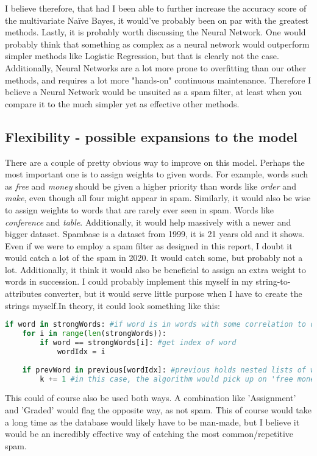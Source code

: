 \documentclass{article}
\begin{document}
I believe therefore, that had I been able to further increase the accuracy score of the multivariate Naïve Bayes, it would've probably been on par with the greatest methods. \newline
Lastly, it is probably worth discussing the Neural Network. One would probably think that something as complex as a neural network would outperform simpler methods like Logistic Regression, but that is clearly not the case. Additionally, Neural Networks are a lot more prone to overfitting than our other methods, and requires a lot more "hands-on" continuous maintenance. Therefore I believe a Neural Network would be unsuited as a spam filter, at least when you compare it to the much simpler yet as effective other methods.
\newpage
\subsection*{Flexibility - possible expansions to the model}
There are a couple of pretty obvious way to improve on this model. Perhaps the most important one is to assign weights to given words. For example, words such as \textit{free} and \textit{money} should be given a higher priority than words like \textit{order} and \textit{make}, even though all four might appear in spam. Similarly, it would also be wise to assign weights to words that are rarely ever seen in spam. Words like \textit{conference} and \textit{table}. \newline
Additionally, it would help massively with a newer and bigger dataset. Spambase is a dataset from 1999, it is 21 years old and it shows. Even if we were to employ a spam filter as designed in this report, I doubt it would catch a lot of the spam in 2020. It would catch some, but probably not a lot. \newline
Additionally, it think it would also be beneficial to assign an extra weight to words in succession. I could probably implement this myself in my string-to-attributes converter, but it would serve little purpose when I have to create the strings myself.\newline In theory, it could look something like this:
\begin{lstlisting}[language=python]
if word in strongWords: #if word is in words with some correlation to other word, for example 'money'
    for i in range(len(strongWords)):
        if word == strongWords[i]: #get index of word
            wordIdx = i
    
    if prevWord in previous[wordIdx]: #previous holds nested lists of words correlated with strongWords[wordIdx], for example 'free'
        k += 1 #in this case, the algorithm would pick up on 'free money' which would assign extra spam weight
\end{lstlisting}
This could of course also be used both ways. A combination like 'Assignment' and 'Graded' would flag the opposite way, as not spam.
\newline This of course would take a long time as the database would likely have to be man-made, but I believe it would be an incredibly effective way of catching the most common/repetitive spam.
\end{document}
